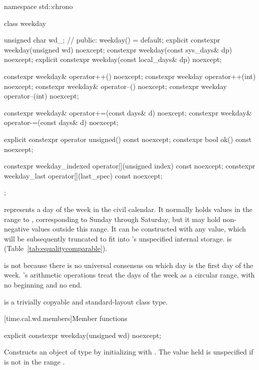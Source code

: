 \begin{codeblock}
namespace std::chrono {
  class weekday {
    unsigned char wd_;          // \expos
  public:
    weekday() = default;
    explicit constexpr weekday(unsigned wd) noexcept;
    constexpr weekday(const sys_days& dp) noexcept;
    explicit constexpr weekday(const local_days& dp) noexcept;

    constexpr weekday& operator++()    noexcept;
    constexpr weekday  operator++(int) noexcept;
    constexpr weekday& operator--()    noexcept;
    constexpr weekday  operator--(int) noexcept;

    constexpr weekday& operator+=(const days& d) noexcept;
    constexpr weekday& operator-=(const days& d) noexcept;

    explicit constexpr operator unsigned() const noexcept;
    constexpr bool ok() const noexcept;

    constexpr weekday_indexed operator[](unsigned index) const noexcept;
    constexpr weekday_last    operator[](last_spec) const noexcept;
  };
}
\end{codeblock}

\pnum
{} represents a day of the week in the civil calendar.
It normally holds values in the range  to ,
corresponding to Sunday through Saturday, but
it may hold non-negative values outside this range.
It can be constructed with any  value,
which will be subsequently truncated to fit into 's unspecified internal storage.
 is  (Table~\ref{tab:equalitycomparable}).
\begin{note}
 is not
because there is no universal consensus on which day is the first day of the week.
's arithmetic operations treat the days of the week as a circular range,
with no beginning and no end.
\end{note}

\pnum
{} is a trivially copyable and standard-layout class type.

[time.cal.wd.members]{Member functions}

%
\begin{itemdecl}
explicit constexpr weekday(unsigned wd) noexcept;
\end{itemdecl}

\begin{itemdescr}
\pnum
\effects
Constructs an object of type  by
initializing  with .
The value held is unspecified if  is not in the range .
\end{itemdescr}

